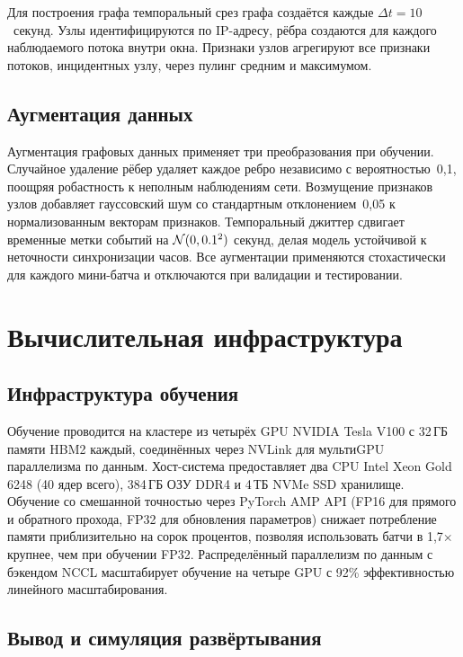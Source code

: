 Для построения графа темпоральный срез графа создаётся каждые $\Delta t=10$~секунд. Узлы идентифицируются по IP-адресу, рёбра создаются для каждого наблюдаемого потока внутри окна. Признаки узлов агрегируют все признаки потоков, инцидентных узлу, через пулинг средним и максимумом.


\subsection{Аугментация данных}
\label{app:augmentation}

Аугментация графовых данных применяет три преобразования при обучении. Случайное удаление рёбер удаляет каждое ребро независимо с вероятностью~0,1, поощряя робастность к неполным наблюдениям сети. Возмущение признаков узлов добавляет гауссовский шум со стандартным отклонением~0,05 к нормализованным векторам признаков. Темпоральный джиттер сдвигает временные метки событий на $\mathcal{N}(0,0.1^2)$ секунд, делая модель устойчивой к неточности синхронизации часов. Все аугментации применяются стохастически для каждого мини-батча и отключаются при валидации и тестировании.


\section{Вычислительная инфраструктура}
\label{app:infrastructure}

\subsection{Инфраструктура обучения}
\label{app:training_infra}

Обучение проводится на кластере из четырёх GPU NVIDIA Tesla V100 с 32\,ГБ памяти HBM2 каждый, соединённых через NVLink для мультиGPU параллелизма по данным. Хост-система предоставляет два CPU Intel Xeon Gold 6248 (40 ядер всего), 384\,ГБ ОЗУ DDR4 и 4\,ТБ NVMe SSD хранилище. Обучение со смешанной точностью через PyTorch AMP API (FP16 для прямого и обратного прохода, FP32 для обновления параметров) снижает потребление памяти приблизительно на сорок процентов, позволяя использовать батчи в 1,7$\times$ крупнее, чем при обучении FP32. Распределённый параллелизм по данным с бэкендом NCCL масштабирует обучение на четыре GPU с 92\% эффективностью линейного масштабирования.


\subsection{Вывод и симуляция развёртывания}
\label{app:inference_opt}

